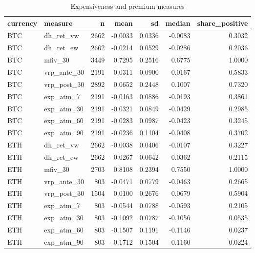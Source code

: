 \begin{table}
\caption{Expensiveness and premium measures}
\label{tab:t3_expensiveness_summary}
\begin{tabular}{llrrrrr}
\toprule
currency & measure & n & mean & sd & median & share\_positive \\
\midrule
BTC & dh\_ret\_vw & 2662 & -0.0033 & 0.0336 & -0.0083 & 0.3032 \\
BTC & dh\_ret\_ew & 2662 & -0.0214 & 0.0529 & -0.0286 & 0.2036 \\
BTC & mfiv\_30 & 3449 & 0.7295 & 0.2516 & 0.6775 & 1.0000 \\
BTC & vrp\_ante\_30 & 2191 & 0.0311 & 0.0900 & 0.0167 & 0.5833 \\
BTC & vrp\_post\_30 & 2892 & 0.0652 & 0.2448 & 0.1007 & 0.7320 \\
BTC & exp\_atm\_7 & 2191 & -0.0163 & 0.0886 & -0.0193 & 0.3861 \\
BTC & exp\_atm\_30 & 2191 & -0.0321 & 0.0849 & -0.0429 & 0.2985 \\
BTC & exp\_atm\_60 & 2191 & -0.0283 & 0.0987 & -0.0423 & 0.3245 \\
BTC & exp\_atm\_90 & 2191 & -0.0236 & 0.1104 & -0.0408 & 0.3702 \\
ETH & dh\_ret\_vw & 2662 & -0.0038 & 0.0406 & -0.0107 & 0.3227 \\
ETH & dh\_ret\_ew & 2662 & -0.0267 & 0.0642 & -0.0362 & 0.2115 \\
ETH & mfiv\_30 & 2703 & 0.8108 & 0.2394 & 0.7550 & 1.0000 \\
ETH & vrp\_ante\_30 & 803 & -0.0471 & 0.0779 & -0.0463 & 0.2665 \\
ETH & vrp\_post\_30 & 1504 & 0.0100 & 0.2676 & 0.0679 & 0.5904 \\
ETH & exp\_atm\_7 & 803 & -0.0544 & 0.0788 & -0.0593 & 0.2105 \\
ETH & exp\_atm\_30 & 803 & -0.1092 & 0.0787 & -0.1056 & 0.0535 \\
ETH & exp\_atm\_60 & 803 & -0.1507 & 0.1191 & -0.1146 & 0.0237 \\
ETH & exp\_atm\_90 & 803 & -0.1712 & 0.1504 & -0.1160 & 0.0224 \\
\bottomrule
\end{tabular}
\end{table}
